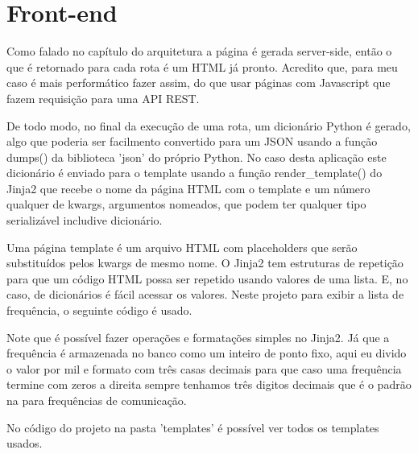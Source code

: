 \chapter{Front-end}

Como falado no capítulo do arquitetura a página é gerada server-side, então
o que é retornado para cada rota é um HTML já pronto. Acredito que, para
meu caso é mais performático fazer assim, do que usar páginas com Javascript
que fazem requisição para uma API REST.

De todo modo, no final da execução de uma rota, um dicionário Python é gerado,
algo que poderia ser facilmento convertido para um JSON usando a função dumps()
da biblioteca 'json' do próprio Python. No caso desta aplicação este dicionário
é enviado para o template usando a função render\_template() do Jinja2 que recebe o nome da 
página HTML com o template e um número qualquer de kwargs, argumentos nomeados,
que podem ter qualquer tipo serializável includive dicionário.

Uma página template é um arquivo HTML com placeholders que serão substituídos
pelos kwargs de mesmo nome. O Jinja2 tem estruturas de repetição para que um
código HTML possa ser repetido usando valores de uma lista. E, no caso, de dicionários
é fácil acessar os valores. Neste projeto para exibir a lista de frequência, 
o seguinte código é usado.



Note que é possível fazer operações e formatações simples no Jinja2. Já que a frequência é
armazenada no banco como um inteiro de ponto fixo, aqui eu divido o valor por mil
e formato com três casas decimais para que caso uma frequência termine com zeros
a direita sempre tenhamos três digitos decimais que é o padrão na para frequências
de comunicação.

No código do projeto na pasta 'templates' é possível ver todos os templates usados.